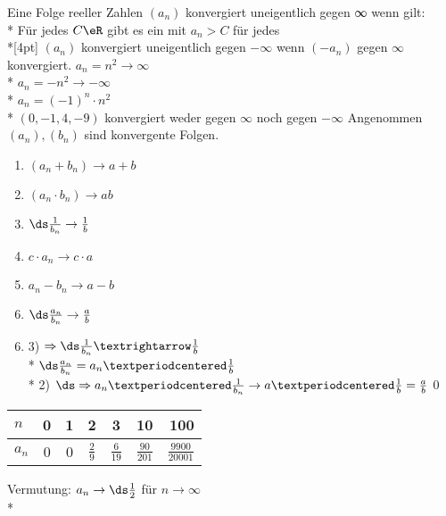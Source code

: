 %
%
\wdh
Eine Folge reeller Zahlen $(a_n)$ konvergiert uneigentlich gegen ∞ wenn gilt:\\*
Für jedes $C\eR$ gibt es ein \nN{} mit $a_n > C$ für jedes \nN\\*[4pt]
$(a_n)$ konvergiert uneigentlich gegen $- ∞$ wenn $(-a_n)$ gegen $∞$ konvergiert.
%
\bsp
$a_n = n^2 \to ∞$\\*
$a_n = -n^2 \to -∞$\\*
$a_n = (-1)^n · n^2$\\*
$(0, -1, 4, -9)$ konvergiert weder gegen $∞$ noch gegen $ - ∞$
%
Angenommen $(a_n), (b_n)$ sind konvergente Folgen.
\begin{enumerate}
\item{$(a_n + b_n) \to a + b$}
\item{$(a_n · b_n) \to ab$}
\item{$\ds\frac{1}{b_n} \to \frac{1}{b}$}
\item{$c · a_n \to c · a$}
\item{$a_n - b_n \to a - b$}
\item{$\ds\frac{a_n}{b_n} \to \frac{a}{b}$}
\end{enumerate}
%
\bew
\begin{enumerate}
\setcounter{enumi}{5}
\item{3) $\Rightarrow\ds\frac{1}{b_n}→\frac{1}{b}$\\*
$\ds\frac{a_n}{b_n} = a_n ·\frac{1}{b}$\\*
2) $\ds\Rightarrow a_n · \frac{1}{b_n} \to a ·\frac{1}{b} = \frac{a}{b}$\qed}
\end{enumerate}
\bsp
\begin{tabular}{l|c|c|c|c|c|r}
$n$   & 0 & 1 & 2 & 3 & 10 & 100\\*\hline
$a_n$ & 0 & 0 & $\frac{2}{9}$ & $\frac{6}{19}$ & $\frac{90}{201}$ & $\frac{9900}{20001}$
\end{tabular}
\quad Vermutung: $a_n \to \ds\frac{1}{2}$ für $n \to ∞$\\*
